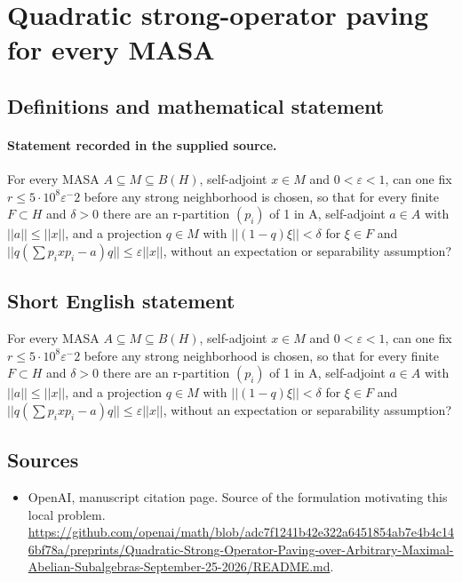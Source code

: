 \documentclass[11pt]{article}
\begin{document}
\section*{Quadratic strong-operator paving for every MASA}\label{statement}
\subsection{Definitions and mathematical statement}
\paragraph{Statement recorded in the supplied source.}
For every MASA $A\subseteq M\subseteq B(H)$, self-adjoint $x\in M$ and $0<\varepsilon <1$, can one fix $r\leq 5\cdot 10^{8}\varepsilon ^-2$ before any strong neighborhood is chosen, so that for every finite $F\subset H$ and $\delta >0$ there are an r-partition $(p_i)$ of 1 in A, self-adjoint $a\in A$ with $||a||\leq ||x||$, and a projection $q\in M$ with $||(1-q)\xi ||<\delta $ for $\xi \in F$ and $||q(\sum p_ixp_i-a)q||\leq \varepsilon ||x||$, without an expectation or separability assumption?
\subsection{Short English statement}
For every MASA $A\subseteq M\subseteq B(H)$, self-adjoint $x\in M$ and $0<\varepsilon <1$, can one fix $r\leq 5\cdot 10^{8}\varepsilon ^-2$ before any strong neighborhood is chosen, so that for every finite $F\subset H$ and $\delta >0$ there are an r-partition $(p_i)$ of 1 in A, self-adjoint $a\in A$ with $||a||\leq ||x||$, and a projection $q\in M$ with $||(1-q)\xi ||<\delta $ for $\xi \in F$ and $||q(\sum p_ixp_i-a)q||\leq \varepsilon ||x||$, without an expectation or separability assumption?
\subsection{Sources}
\begin{itemize}
\item[S1] OpenAI, manuscript citation page. Source of the formulation motivating this local problem.
\url{https://github.com/openai/math/blob/adc7f1241b42e322a6451854ab7e4b4c146bf78a/preprints/Quadratic-Strong-Operator-Paving-over-Arbitrary-Maximal-Abelian-Subalgebras-September-25-2026/README.md}.
\end{itemize}
\end{document}
